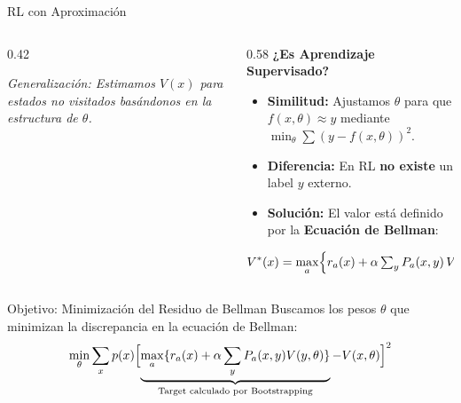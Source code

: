 \documentclass[xcolor=dvipsnames, handout]{beamer}
\begin{document}
\begin{frame}{RL con Aproximaci\'on}
\begin{columns}[T]
\begin{column}{0.42\textwidth}
    \centering
    \vspace{0.1cm}
    \scriptsize \textit{Generalizaci\'on: Estimamos $V(x)$ para estados no visitados bas\'andonos en la estructura de $\theta$.}
\end{column}

\begin{column}{0.58\textwidth}
    \small
    \textbf{¿Es Aprendizaje Supervisado?}
    \begin{itemize}
        \item \textbf{Similitud:} Ajustamos $\theta$ para que $f(x,\theta) \approx y$ mediante $\min_\theta \sum (y - f(x,\theta))^2$.
        \item \textbf{Diferencia:} En RL \textbf{no existe} un label $y$ externo.
        \item \textbf{Soluci\'on:} El valor est\'a definido por la \textbf{Ecuaci\'on de Bellman}:
    \end{itemize}
    \vspace{-0.2cm}
    \footnotesize
    \[ V^*(x)=\max_a \Bigl\{r_a(x)+\alpha\textstyle\sum_y P_a(x,y)\,V^*(y)\Bigr\} \]
\end{column}
\end{columns}

\vspace{0.2cm}

\begin{block}{Objetivo: Minimizaci\'on del Residuo de Bellman}
Buscamos los pesos $\theta$ que minimizan la discrepancia en la ecuaci\'on de Bellman:
\small
\[ \min_\theta \sum_x p(x) \Bigl[ \underbrace{\max_a \{ r_a(x) + \alpha \sum_y P_a(x,y) V(y,\theta) \}}_{\text{Target calculado por Bootstrapping}} - V(x,\theta) \Bigr]^2 \]
\end{block}
\end{frame}
\end{document}
